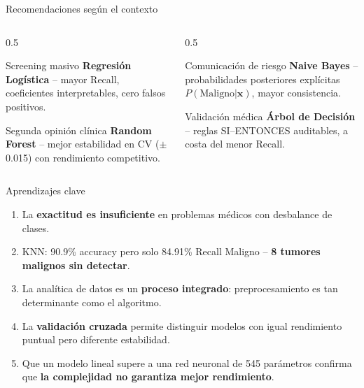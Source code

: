 \documentclass[10pt,aspectratio=169]{beamer}
\begin{document}
\begin{frame}{Recomendaciones según el contexto}
\begin{columns}
\begin{column}{0.5\textwidth}
\begin{exampleblock}{Screening masivo}
\textbf{Regresión Logística} -- mayor Recall, coeficientes interpretables, cero falsos positivos.
\end{exampleblock}

\vspace{0.5em}
\begin{block}{Segunda opinión clínica}
\textbf{Random Forest} -- mejor estabilidad en CV ($\pm$0.015) con rendimiento competitivo.
\end{block}
\end{column}

\begin{column}{0.5\textwidth}
\begin{block}{Comunicación de riesgo}
\textbf{Naive Bayes} -- probabilidades posteriores explícitas $P(\text{Maligno}|\mathbf{x})$, mayor consistencia.
\end{block}

\vspace{0.5em}
\begin{alertblock}{Validación médica}
\textbf{Árbol de Decisión} -- reglas SI--ENTONCES auditables, a costa del menor Recall.
\end{alertblock}
\end{column}
\end{columns}
\end{frame}

\begin{frame}{Aprendizajes clave}
\begin{enumerate}
  \item La \textbf{exactitud es insuficiente} en problemas médicos con desbalance de clases.
  
  \item KNN: 90.9\% accuracy pero solo 84.91\% Recall Maligno -- \textbf{8 tumores malignos sin detectar}.
  
  \item La analítica de datos es un \textbf{proceso integrado}: preprocesamiento es tan determinante como el algoritmo.
  
  \item La \textbf{validación cruzada} permite distinguir modelos con igual rendimiento puntual pero diferente estabilidad.
  
  \item Que un modelo lineal supere a una red neuronal de 545 parámetros confirma que \textbf{la complejidad no garantiza mejor rendimiento}.
\end{enumerate}
\end{frame}
\end{document}
